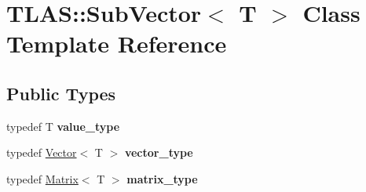\hypertarget{classTLAS_1_1SubVector}{}\section{T\+L\+AS\+:\+:Sub\+Vector$<$ T $>$ Class Template Reference}
\label{classTLAS_1_1SubVector}
\subsection*{Public Types}
\begin{DoxyCompactItemize}
\item 
\mbox{\label{classTLAS_1_1SubVector_a18ba915e91fb97acefe98c1b2260498d}} 
typedef T {\bfseries value\+\_\+type}
\item 
\mbox{\label{classTLAS_1_1SubVector_a6460bcbff6901b480212c2c8d6e112f0}} 
typedef \hyperlink{classTLAS_1_1Vector}{Vector}$<$ T $>$ {\bfseries vector\+\_\+type}
\item 
\mbox{\label{classTLAS_1_1SubVector_a894f5982f0ca99d7a16dd2e340bfc153}} 
typedef \hyperlink{classTLAS_1_1Matrix}{Matrix}$<$ T $>$ {\bfseries matrix\+\_\+type}
\end{DoxyCompactItemize}
